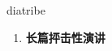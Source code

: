 
\begin{frame}
{\huge diatribe}
\begin{center}
\begin{enumerate}\Large
  \item \textbf{长篇抨击性演讲}
\end{enumerate}
\end{center}
\end{frame}
